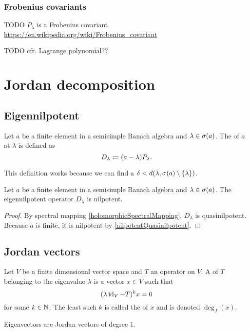 \subsubsection{Frobenius covariants}
TODO $P_\lambda$ is a Frobenius covariant. \url{https://en.wikipedia.org/wiki/Frobenius_covariant}

TODO cfr. Lagrange polynomial??

\section{Jordan decomposition}
\subsection{Eigennilpotent}
\begin{definition}
Let $a$ be a finite element in a semisimple Banach algebra and $\lambda\in \sigma(a)$. The  of $a$ at $\lambda$ is defined as
\[ D_{\lambda} \coloneqq (a-\lambda)P_{\lambda}. \]
\end{definition}
This definition works because we can find a $\delta < d(\lambda, \sigma(a)\setminus\{\lambda\})$.

\begin{lemma}
Let $a$ be a finite element in a semisimple Banach algebra and $\lambda\in \sigma(a)$. The eigennilpotent operator $D_\lambda$ is nilpotent.
\end{lemma}
\begin{proof}
By spectral mapping \ref{holomorphicSpectralMapping}, $D_\lambda$ is quasinilpotent. Because $a$ is finite, it is nilpotent by \ref{nilpotentQuasinilpotent}.
\end{proof}



\subsection{Jordan vectors}
\begin{definition}
Let $V$ be a finite dimensional vector space and $T$ an operator on $V$. A  of $T$ belonging to the eigenvalue $\lambda$ is a vector $x\in V$ such that
\[ (\lambda\operatorname{id}_V - T)^kx = 0 \]
for some $k\in \mathbb{N}$. The least such $k$ is called the  of $x$ and is denoted $\deg_J(x)$.
\end{definition}
Eigenvectors are Jordan vectors of degree $1$.

